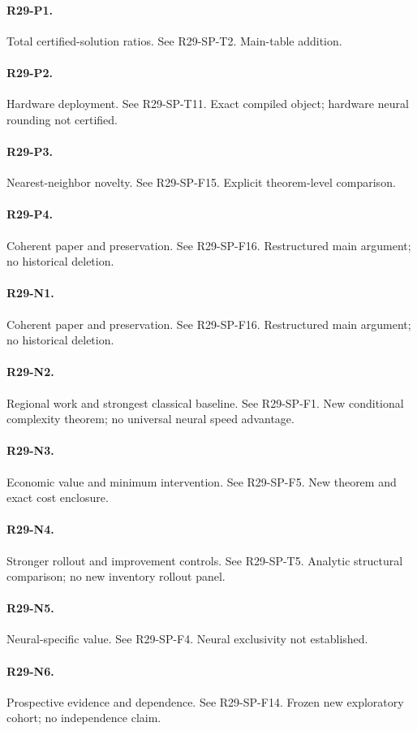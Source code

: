 \paragraph{R29-P1.} Total certified-solution ratios. See R29-SP-T2. Main-table addition.
\paragraph{R29-P2.} Hardware deployment. See R29-SP-T11. Exact compiled object; hardware neural rounding not certified.
\paragraph{R29-P3.} Nearest-neighbor novelty. See R29-SP-F15. Explicit theorem-level comparison.
\paragraph{R29-P4.} Coherent paper and preservation. See R29-SP-F16. Restructured main argument; no historical deletion.
\paragraph{R29-N1.} Coherent paper and preservation. See R29-SP-F16. Restructured main argument; no historical deletion.
\paragraph{R29-N2.} Regional work and strongest classical baseline. See R29-SP-F1. New conditional complexity theorem; no universal neural speed advantage.
\paragraph{R29-N3.} Economic value and minimum intervention. See R29-SP-F5. New theorem and exact cost enclosure.
\paragraph{R29-N4.} Stronger rollout and improvement controls. See R29-SP-T5. Analytic structural comparison; no new inventory rollout panel.
\paragraph{R29-N5.} Neural-specific value. See R29-SP-F4. Neural exclusivity not established.
\paragraph{R29-N6.} Prospective evidence and dependence. See R29-SP-F14. Frozen new exploratory cohort; no independence claim.
